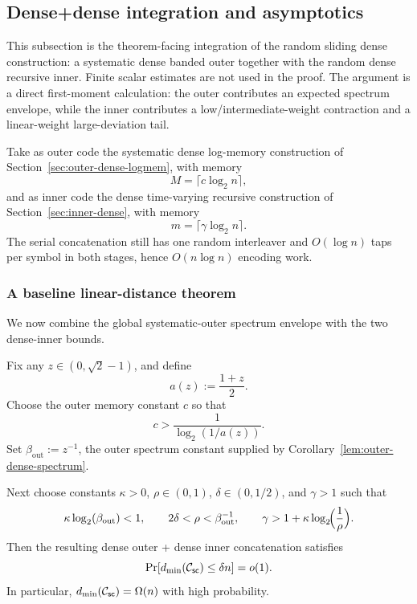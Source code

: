 \subsection{Dense+dense integration and asymptotics}
\label{sec:integrations}

This subsection is the theorem-facing integration of the random sliding dense construction:
a systematic dense banded outer together with the random dense recursive inner.
Finite scalar estimates are not used in the proof.  The argument is a direct first-moment calculation:
the outer contributes an expected spectrum envelope, while the inner contributes a low/intermediate-weight contraction
and a linear-weight large-deviation tail.

Take as outer code the systematic dense log-memory construction of
Section~\ref{sec:outer-dense-logmem}, with memory
\[
M=\lceil c\log_2 n\rceil,
\]
and as inner code the dense time-varying recursive construction of
Section~\ref{sec:inner-dense}, with memory
\[
m=\lceil \gamma \log_2 n\rceil.
\]
The serial concatenation still has one random interleaver and \(O(\log n)\) taps per symbol in both stages,
hence \(O(n\log n)\) encoding work.

\subsubsection{A baseline linear-distance theorem}
\label{sec:integration-dense-dense-baseline}

We now combine the global systematic-outer spectrum envelope with the two dense-inner bounds.

\begin{theorem}
\label{thm:dense-dense-integration}
Fix any \(z\in(0,\sqrt2-1)\), and define
\[
a(z):=\frac{1+z}{2}.
\]
Choose the outer memory constant \(c\) so that
\begin{equation}
\label{eq:dense-c-condition}
c>\frac{1}{\log_2(1/a(z))}.
\end{equation}
Set \(\beta_{\mathrm{out}}:=z^{-1}\), the outer spectrum constant supplied by
Corollary~\ref{lem:outer-dense-spectrum}.

Next choose constants \(\kappa>0\), \(\rho\in(0,1)\), \(\delta\in(0,1/2)\), and \(\gamma>1\) such that
\begin{equation}
\label{eq:dense-dense-parameter-conditions}
\kappa\log_2(\beta_{\mathrm{out}})<1,
\qquad
2\delta<\rho<\beta_{\mathrm{out}}^{-1},
\qquad
\gamma>1+\kappa\log_2\!\Bigl(\frac{1}{\rho}\Bigr).
\end{equation}
Then the resulting dense outer + dense inner concatenation satisfies
\[
\Pr[d_{\min}({\mathcal{C}_{\mathsf{sc}}})\le \delta n]=o(1).
\]
In particular, \(d_{\min}({\mathcal{C}_{\mathsf{sc}}})=\Omega(n)\) with high probability.
\end{theorem}

